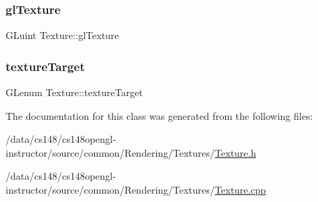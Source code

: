 \subsubsection{\texorpdfstring{gl\+Texture}{glTexture}}
{\footnotesize\ttfamily G\+Luint Texture\+::gl\+Texture\hspace{0.3cm}{\ttfamily [protected]}}

\hypertarget{class_texture_a743402dc306a143404ee2d246d864fb7}{}\label{class_texture_a743402dc306a143404ee2d246d864fb7} 
\subsubsection{\texorpdfstring{texture\+Target}{textureTarget}}
{\footnotesize\ttfamily G\+Lenum Texture\+::texture\+Target\hspace{0.3cm}{\ttfamily [protected]}}



The documentation for this class was generated from the following files\+:\begin{DoxyCompactItemize}
\item 
/data/cs148/cs148opengl-\/instructor/source/common/\+Rendering/\+Textures/\hyperlink{_texture_8h}{Texture.\+h}\item 
/data/cs148/cs148opengl-\/instructor/source/common/\+Rendering/\+Textures/\hyperlink{_texture_8cpp}{Texture.\+cpp}\end{DoxyCompactItemize}
